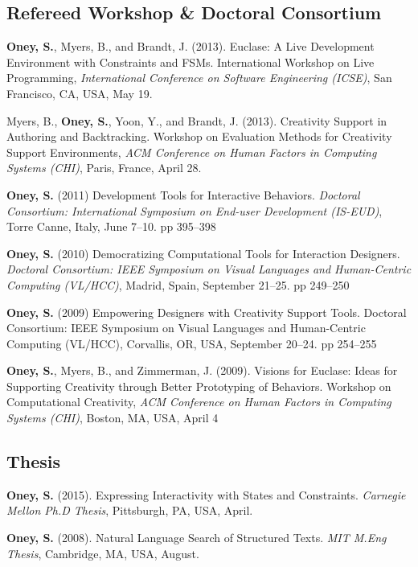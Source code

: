 \subsection{Refereed Workshop \& Doctoral Consortium}

 {
\textbf{Oney, S.}, Myers, B., and Brandt, J. (2013). Euclase: A Live Development Environment with Constraints and FSMs. International Workshop on Live Programming, \textit{International Conference on Software Engineering (ICSE)}, San Francisco, CA, USA, May 19.
}

 {
Myers, B., \textbf{Oney, S.}, Yoon, Y., and Brandt, J. (2013). Creativity Support in Authoring and Backtracking. Workshop on Evaluation Methods for Creativity Support Environments, \textit{ACM Conference on Human Factors in Computing Systems (CHI)}, Paris, France, April 28.
}

 {
\textbf{Oney, S.} (2011) Development Tools for Interactive Behaviors. \textit{Doctoral Consortium: International Symposium on End-user Development (IS-EUD)}, Torre Canne, Italy, June 7--10. pp 395--398
}

 {
\textbf{Oney, S.} (2010) Democratizing Computational Tools for Interaction Designers. \textit{Doctoral Consortium: IEEE Symposium on Visual Languages and Human-Centric Computing (VL/HCC)}, Madrid, Spain, September 21--25. pp 249--250
}

 {
\textbf{Oney, S.} (2009) Empowering Designers with Creativity Support Tools. Doctoral Consortium: IEEE Symposium on Visual Languages and Human-Centric Computing (VL/HCC), Corvallis, OR, USA, September 20--24. pp 254--255
}

 {
\textbf{Oney, S.}, Myers, B., and Zimmerman, J. (2009). Visions for Euclase: Ideas for Supporting Creativity through Better Prototyping of Behaviors. Workshop on Computational Creativity, \textit{ACM Conference on Human Factors in Computing Systems (CHI)}, Boston, MA, USA, April 4
}

\subsection{Thesis}

 {
\textbf{Oney, S.} (2015). Expressing Interactivity with States and Constraints. \textit{Carnegie Mellon Ph.D Thesis}, Pittsburgh, PA, USA, April.
}

 {
\textbf{Oney, S.} (2008). Natural Language Search of Structured Texts. \textit{MIT M.Eng Thesis}, Cambridge, MA, USA, August.
}
